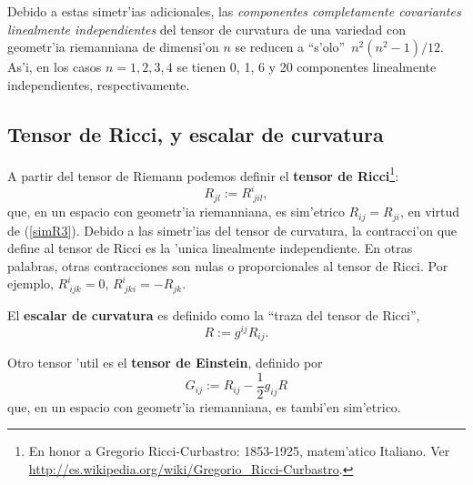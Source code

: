 Debido a estas simetr'ias adicionales, las \textit{componentes completamente covariantes linealmente independientes} del tensor de curvatura de una variedad con geometr'ia riemanniana de dimensi'on $n$ se reducen a ``s'olo''\, $n^2(n^2-1)/12$. As'i, en los casos $n=1,2,3,4$ se tienen 0, 1, 6 y 20 componentes linealmente independientes, respectivamente.

\subsection{Tensor de Ricci, y escalar de curvatura}
A partir del tensor de Riemann podemos definir el \textbf{tensor de Ricci}\footnote{En honor a Gregorio Ricci-Curbastro: 1853-1925, matem'atico Italiano. Ver \url{http://es.wikipedia.org/wiki/Gregorio_Ricci-Curbastro}.}:
\begin{equation}
R_{jl}:=R_{\ jil}^i,
\end{equation}
que, en un espacio con geometr'ia riemanniana, es sim'etrico $R_{ij}=R_{ji}$, en virtud de (\ref{simR3}). Debido a las simetr'ias del tensor de curvatura, la contracci'on que define al tensor de Ricci es la 'unica linealmente independiente. En otras palabras, otras contracciones son nulas o proporcionales al tensor de Ricci. Por ejemplo, $R^i_{\ ijk}=0$, $R^i_{\ jki}=-R_{jk}$.

El \textbf{escalar de curvatura} es definido como la ``traza del tensor de
Ricci'',
\begin{equation}
R :=g^{ij}R_{ij}.
\end{equation}

Otro tensor 'util es el \textbf{tensor de Einstein}, definido por
\begin{equation}
G_{ij} :=R_{ij}-\frac{1}{2}g_{ij}R
\end{equation}
que, en un espacio con geometr'ia riemanniana, es tambi'en sim'etrico.




